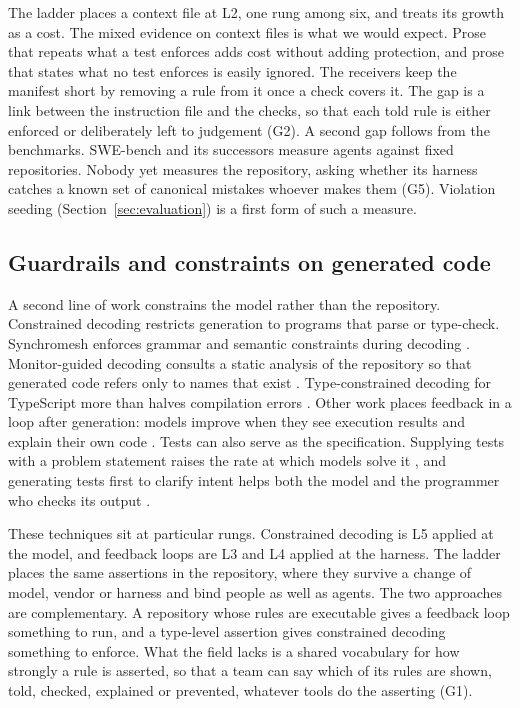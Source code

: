The ladder places a context file at L2, one rung among six, and treats its growth as a cost.
The mixed evidence on context files is what we would expect. Prose that repeats what a test
enforces adds cost without adding protection, and prose that states what no test enforces is
easily ignored. The receivers keep the manifest short by removing a rule from it once a check
covers it. The gap is a link between the instruction file and the checks, so that each told
rule is either enforced or deliberately left to judgement (G2). A second gap follows from the
benchmarks. SWE-bench and its successors measure agents against fixed repositories. Nobody yet
measures the repository, asking whether its harness catches a known set of canonical mistakes
whoever makes them (G5). Violation seeding (Section~\ref{sec:evaluation})
is a first form of such a measure.

\subsection{Guardrails and constraints on generated code}

A second line of work constrains the model rather than the repository. Constrained decoding
restricts generation to programs that parse or type-check. Synchromesh enforces grammar and
semantic constraints during decoding \citep{poesia2022synchromesh}. Monitor-guided decoding
consults a static analysis of the repository so that generated code refers only to names that
exist \citep{agrawal2023monitor}. Type-constrained decoding for TypeScript more than halves
compilation errors \citep{mundler2025typeconstrained}. Other work places feedback in a loop
after generation: models improve when they see execution results and explain their own code
\citep{chen2024selfdebug}. Tests can also serve as the specification. Supplying tests with a
problem statement raises the rate at which models solve it \citep{mathews2024tdd}, and
generating tests first to clarify intent helps both the model and the programmer who checks its
output \citep{fakhoury2024ticoder}.

These techniques sit at particular rungs. Constrained decoding is L5 applied at the model, and
feedback loops are L3 and L4 applied at the harness. The ladder places the same assertions in
the repository, where they survive a change of model, vendor or harness and bind people as well
as agents. The two approaches are complementary. A repository whose rules are executable gives a
feedback loop something to run, and a type-level assertion gives constrained decoding something
to enforce. What the field lacks is a shared vocabulary for how strongly a rule is asserted, so
that a team can say which of its rules are shown, told, checked, explained or prevented,
whatever tools do the asserting (G1).

